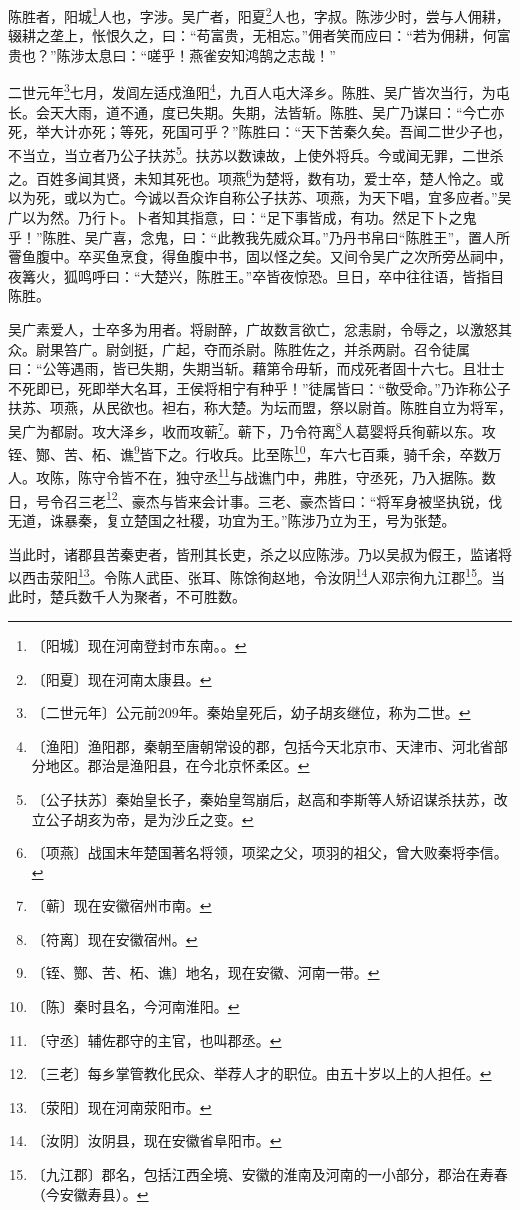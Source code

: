 \documentclass[12pt,UTF-8,openany,a4]{ctexbook}
\begin{document}
\begin{large}
    
    陈胜者，阳城\footnote{〔阳城〕\yiwen 现在河南登封市东南。。}人也，字涉。吴广者，阳夏\footnote{〔阳夏〕\yiwen 现在河南太康县。}人也，字叔。陈涉少时，尝与人佣耕，辍耕之垄上，怅恨久之，曰：“苟富贵，无相忘。”佣者笑而应曰：“若为佣耕，何富贵也？”陈涉太息曰：“嗟乎！燕雀安知鸿鹄之志哉！”
    
    二世元年\footnote{〔二世元年〕\yiwen 公元前209年。秦始皇死后，幼子胡亥继位，称为二世。}七月，发闾左适戍渔阳\footnote{〔渔阳〕\yiwen 渔阳郡，秦朝至唐朝常设的郡，包括今天北京市、天津市、河北省部分地区。郡治是渔阳县，在今北京怀柔区。}，九百人屯大泽乡。陈胜、吴广皆次当行，为屯长。会天大雨，道不通，度已失期。失期，法皆斩。陈胜、吴广乃谋曰：“今亡亦死，举大计亦死；等死，死国可乎？”陈胜曰：“天下苦秦久矣。吾闻二世少子也，不当立，当立者乃公子扶苏\footnote{〔公子扶苏〕\yiwen 秦始皇长子，秦始皇驾崩后，赵高和李斯等人矫诏谋杀扶苏，改立公子胡亥为帝，是为沙丘之变。}。扶苏以数谏故，上使外将兵。今或闻无罪，二世杀之。百姓多闻其贤，未知其死也。项燕\footnote{〔项燕〕\yiwen 战国末年楚国著名将领，项梁之父，项羽的祖父，曾大败秦将李信。}为楚将，数有功，爱士卒，楚人怜之。或以为死，或以为亡。今诚以吾众诈自称公子扶苏、项燕，为天下唱，宜多应者。”吴广以为然。乃行卜。卜者知其指意，曰：“足下事皆成，有功。然足下卜之鬼乎！”陈胜、吴广喜，念鬼，曰：“此教我先威众耳。”乃丹书帛曰“陈胜王”，置人所罾鱼腹中。卒买鱼烹食，得鱼腹中书，固以怪之矣。又间令吴广之次所旁丛祠中，夜篝火，狐鸣呼曰：“大楚兴，陈胜王。”卒皆夜惊恐。旦日，卒中往往语，皆指目陈胜。
    
    吴广素爱人，士卒多为用者。将尉醉，广故数言欲亡，忿恚尉，令辱之，以激怒其众。尉果笞广。尉剑挺，广起，夺而杀尉。陈胜佐之，并杀两尉。召令徒属曰：“公等遇雨，皆已失期，失期当斩。藉第令毋斩，而戍死者固十六七。且壮士不死即已，死即举大名耳，王侯将相宁有种乎！”徒属皆曰：“敬受命。”乃诈称公子扶苏、项燕，从民欲也。袒右，称大楚。为坛而盟，祭以尉首。陈胜自立为将军，吴广为都尉。攻大泽乡，收而攻蕲\footnote{〔蕲〕\yiwen 现在安徽宿州市南。}。蕲下，乃令符离\footnote{〔符离〕\yiwen 现在安徽宿州。}人葛婴将兵徇蕲以东。攻铚、酂、苦、柘、谯\footnote{〔铚、酂、苦、柘、谯〕\yiwen 地名，现在安徽、河南一带。}皆下之。行收兵。比至陈\footnote{〔陈〕\yiwen 秦时县名，今河南淮阳。}，车六七百乘，骑千余，卒数万人。攻陈，陈守令皆不在，独守丞\footnote{〔守丞〕\yiwen 辅佐郡守的主官，也叫郡丞。}与战谯门中，弗胜，守丞死，乃入据陈。数日，号令召三老\footnote{〔三老〕\yiwen 每乡掌管教化民众、举荐人才的职位。由五十岁以上的人担任。}、豪杰与皆来会计事。三老、豪杰皆曰：“将军身被坚执锐，伐无道，诛暴秦，复立楚国之社稷，功宜为王。”陈涉乃立为王，号为张楚。
    
    当此时，诸郡县苦秦吏者，皆刑其长吏，杀之以应陈涉。乃以吴叔为假王，监诸将以西击荥阳\footnote{〔荥阳〕\yiwen 现在河南荥阳市。}。令陈人武臣、张耳、陈馀徇赵地，令汝阴\footnote{〔汝阴〕\yiwen 汝阴县，现在安徽省阜阳市。}人邓宗徇九江郡\footnote{〔九江郡〕\yiwen 郡名，包括江西全境、安徽的淮南及河南的一小部分，郡治在寿春（今安徽寿县）。}。当此时，楚兵数千人为聚者，不可胜数。
\end{large}
\end{document}

